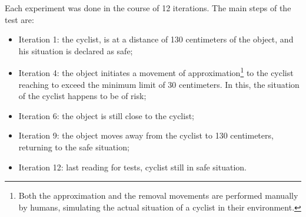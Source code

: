         Each experiment was done in the course of 12 iterations.
        The main steps of the test are:
        \begin{itemize}
            \item Iteration 1: the cyclist, is at a distance of 130 centimeters of the object, and his situation is declared as safe;
            
            \item Iteration 4: the object initiates a movement of approximation\footnote{Both the approximation and the removal movements are performed manually by humans, simulating the actual situation of a cyclist in their environment.} to the cyclist reaching to exceed the minimum limit of 30 centimeters. 
            In this, the situation of the cyclist happens to be of risk;
            
            \item Iteration 6: the object is still close to the cyclist;
            
            \item Iteration 9: the object moves away from the cyclist to 130 centimeters, returning to the safe situation;
            
            \item Iteration 12: last reading for tests, cyclist still in safe situation.
        \end{itemize}
    

